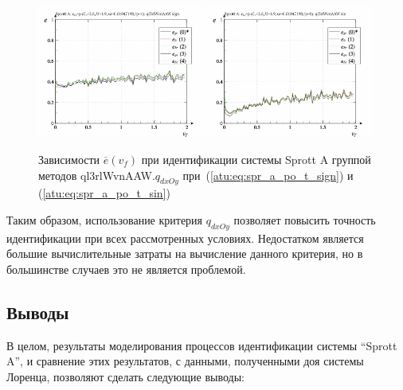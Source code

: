 \begin{figure}[htb!]
  \centerline{
    \includegraphics[width=0.49\textwidth]{p/cha/spr_a/ql3rlWvnAAW_dxOy/sprott_a_id2-p_v_f_sign.png}
    \hfill
    \includegraphics[width=0.49\textwidth]{p/cha/spr_a/ql3rlWvnAAW_dxOy/sprott_a_id2-p_v_f_sin.png}
  }
  \caption{Зависимости $\overline{e}(v_f)$ при идентификации системы Sprott A группой методов ql3rlWvnAAW.$q_{dxOy}$
   при~(\ref{atu:eq:spr_a_po_t_sign}) и (\ref{atu:eq:spr_a_po_t_sin})}
  \label{atu:f:spr_a_v_f_ql3rlWvnAAW_q_dxOy}
\end{figure}

Таким образом, использование критерия $q_{dxOy}$
позволяет повысить точность идентификации при всех рассмотренных
условиях. Недостатком является большие вычислительные затраты
на вычисление данного критерия, но в большинстве случаев это не является проблемой.



\subsection{Выводы}  %

В целом, результаты моделирования процессов идентификации системы ``Sprott A'',
и сравнение этих результатов, с данными, полученными
доя системы Лоренца, позволяют сделать следующие выводы:

